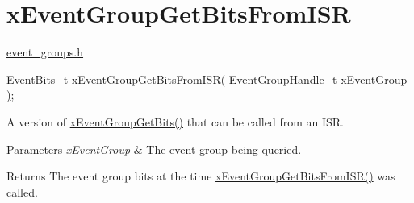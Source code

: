 \hypertarget{group__x_event_group_get_bits_from_i_s_r}{}\section{x\+Event\+Group\+Get\+Bits\+From\+I\+SR}
\label{group__x_event_group_get_bits_from_i_s_r}
\hyperlink{event__groups_8h}{event\+\_\+groups.\+h} 
\begin{DoxyPre}
   EventBits\_t \hyperlink{event__groups_8h_adcb3d3f7dded9fa372bb1ee405c36b8d}{xEventGroupGetBitsFromISR( EventGroupHandle\_t xEventGroup )};
\end{DoxyPre}


A version of \hyperlink{event__groups_8h_a0ae86f092fb07ccb475ae938f9a12584}{x\+Event\+Group\+Get\+Bits()} that can be called from an I\+SR.


\begin{DoxyParams}{Parameters}
{\em x\+Event\+Group} & The event group being queried.\\
\hline
\end{DoxyParams}
\begin{DoxyReturn}{Returns}
The event group bits at the time \hyperlink{event__groups_8h_adcb3d3f7dded9fa372bb1ee405c36b8d}{x\+Event\+Group\+Get\+Bits\+From\+I\+S\+R()} was called. 
\end{DoxyReturn}
